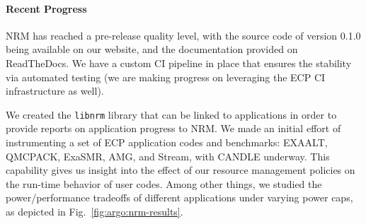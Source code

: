 \paragraph{Recent Progress}



NRM has reached a pre-release quality level, with the source code of
version 0.1.0 being available on our website, and the documentation
provided on ReadTheDocs.  We have a custom CI pipeline in place that
ensures the stability via automated testing (we are making progress on
leveraging the ECP CI infrastructure as well).

We created the \texttt{libnrm} library that can be linked to applications
in order to provide reports on application progress to NRM.  We made an
initial effort of instrumenting a set of ECP application codes and
benchmarks: EXAALT, QMCPACK, ExaSMR, AMG, and Stream, with CANDLE underway.
This capability gives us insight into the effect of our resource management
policies on the run-time behavior of user codes.  Among other things, we
studied the power/performance tradeoffs of different applications under
varying power caps, as depicted in Fig.~\ref{fig:argo:nrm-results}.

